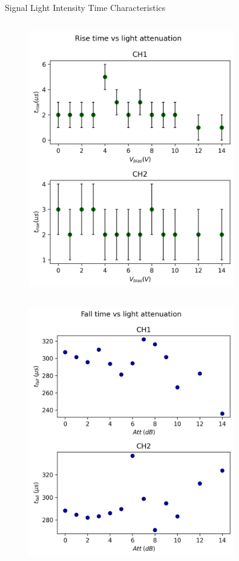 \begin{columnframe}{Signal Light Intensity Time Characteristics}
    \begin{column}{0.5\textwidth}
        \begin{figure}
            \centering
            \includegraphics[width=0.8\textwidth, frame]{images/rise_times_att.png}
        \end{figure}
    \end{column}
    \begin{column}{0.5\textwidth}
        \begin{figure}
            \centering
            \includegraphics[width=0.8\textwidth, frame]{images/fall_times_att.png}
        \end{figure}
    \end{column}
\end{columnframe}


